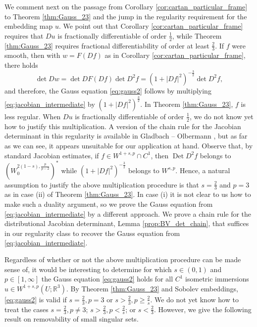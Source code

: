 \documentclass[12pt]{article}
\newcommand{\R}{\mathbb{R}}
\newcommand{\Det}{\operatorname{Det}}
\theoremstyle{plain}
\numberwithin{equation}{section}
\begin{document}
We comment next on the passage from Corollary \ref{cor:cartan_particular_frame} to Theorem \ref{thm:Gauss_23} and the jump in the regularity requirement for the embedding map $u$. We point out that Corollary \ref{cor:cartan_particular_frame} requires that $Du$ is fractionally differentiable of order $\frac12$, while Theorem \ref{thm:Gauss_23} requires fractional differentiability of order at least $\frac23$. If $f$ were smooth, then with $w = F(Df)$ as in Corollary \ref{cor:cartan_particular_frame}, there holds
\begin{equation} \label{eq:detDw_from_f}
    \det Dw = \det DF(Df) \det D^2f = (1+|Df|^2)^{-\frac32} \det D^2 f,
\end{equation}
and therefore, the Gauss equation \eqref{eq:gauss2} follows by multiplying \eqref{eq:jacobian_intermediate} by $(1+|Df|^2)^{\frac32}$. In Theorem \ref{thm:Gauss_23}, $f$ is less regular. When $Du$ is fractionally differentiable of order $\frac12$, we do not know yet how to justify this multiplication. A version of the chain rule for the Jacobian determinant in this regularity is available in Gladbach -- Olbermann \cite{gladbach_olbermann}, but as far as we can see, it appears unsuitable for our application at hand. Observe that, by standard Jacobian estimates, if $f \in W^{1+s,p} \cap C^1$, then $\Det D^2 f$ belongs to $(W^{2(1-s),\frac{p}{p-2}}_0)^*$ while $(1+|Df|^2)^{-\frac32}$ belongs to $W^{s,p}$. Hence, a natural assumption to justify the above multiplication procedure is that  $s = \frac23$ and $p=3$ as in case (ii) of Theorem \ref{thm:Gauss_23}. In case (i) it is not clear to us how to make such a duality argument, so we prove the Gauss equation from \eqref{eq:jacobian_intermediate} by a different approach. We prove a chain rule for the distributional Jacobian determinant, Lemma \ref{prop:BV_det_chain}, that suffices in our regularity class to recover the Gauss equation from \eqref{eq:jacobian_intermediate}. 

Regardless of whether or not the above multiplication procedure can be made sense of, it would be interesting to determine for which $s \in (0,1)$ and $p \in [1,\infty]$ the Gauss equation \eqref{eq:gauss2} holds for all $C^1$ isometric immersions $u \in W^{1+s,p}(U;\R^3)$. By Theorem \ref{thm:Gauss_23} and Sobolev embeddings, \eqref{eq:gauss2} is valid if $s=\frac23,p=3$ or $s > \frac23, p \geq \frac2s$. We do not yet know how to treat the cases $s=\frac23, p \neq 3$; $s> \frac23, p < \frac2s$; or $s < \frac23$. However, we give the following result on removability of small singular sets.
\end{document}
